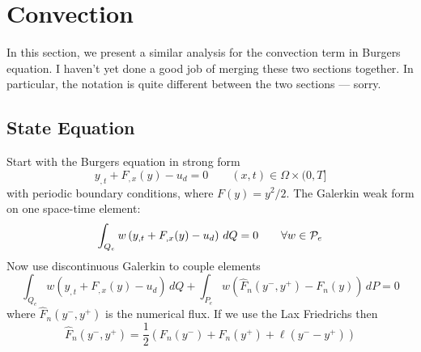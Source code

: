 \documentclass[12pt]{article}
\begin{document}
\section{Convection}

In this section, we present a similar analysis for the convection term in
Burgers equation.  I haven't yet done a good job of merging these two sections
together. In particular, the notation is quite different between the two
sections --- sorry.

\subsection{State Equation}
Start with the Burgers equation in strong form
\[ y_{,t} + F_{,x}(y) 
   - u_d = 0 \qquad (x,t)\in\Omega\times(0,T] \]
%
with periodic boundary conditions, where $F(y) = y^2/2$.  The Galerkin weak
form on one space-time element:
%
\[ \int_{Q_e} w  \left( y_{,t} + F_{,x}(y) - u_d
   \right) \,dQ = 0  \qquad \forall w\in{\cal P}_e \] 
%
Now use discontinuous Galerkin to couple elements
%
\[ \int_{Q_e} w \left( y_{,t} + F_{,x}(y) 
   - u_d \right) \,dQ +
   \int_{P_e} w \left( \widehat F_n(y^-,y^+) - F_n(y) \right) \,dP = 0 \]
%
where $\widehat F_n(y^-,y^+)$ is the numerical flux.  If we use the Lax
Friedrichs then
%
\[ \widehat F_n(y^-,y^+) = \frac{1}{2}\left( F_n(y^-) + F_n(y^+) + 
   \ell \left( y^- - y^+ \right) \right) \]
\end{document}
